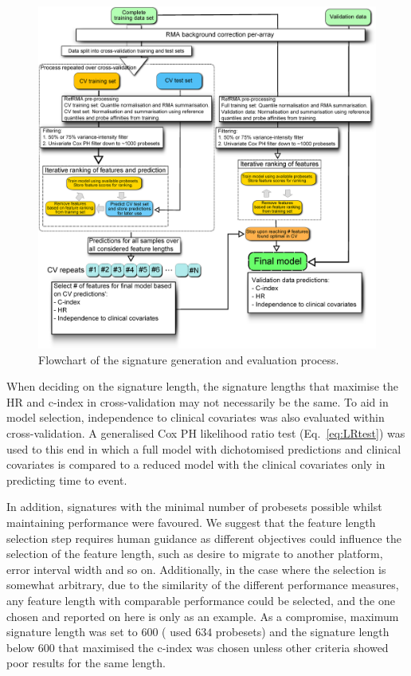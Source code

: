 \documentclass[letterpaper,12pt]{article}
\begin{document}
\begin{figure}[!th]
\centering
\includegraphics[scale=0.30]{Figures/WorkflowOverview.eps}
\caption{Flowchart of the signature generation and evaluation process.}
\label{Fig:SignGenFlowchart}
\end{figure}

When deciding on the signature length, the signature lengths that maximise the HR and c-index in cross-validation may not necessarily be the same. To aid in model selection, independence to clinical covariates was also evaluated within cross-validation. A generalised Cox PH likelihood ratio test (Eq.\ \ref{eq:LRtest}) was used to this end in which a full model with dichotomised predictions and clinical covariates is compared to a reduced model with the clinical covariates only in predicting time to event. 

In addition, signatures with the minimal number of probesets possible whilst maintaining performance were favoured. We suggest that the feature length selection step requires human guidance as different objectives could influence the selection of the feature length, such as desire to migrate to another platform, error interval width and so on.  Additionally, in the case where the selection is somewhat arbitrary, due to the similarity of the different performance measures, any feature length with comparable performance could be selected, and the one chosen and reported on here is only as an example. As a compromise, maximum signature length was set to $600$ (\citet{Kennedy:11} used $634$ probesets) and the signature length below $600$ that maximised the c-index was chosen unless other criteria showed poor results for the same length.
\end{document}
